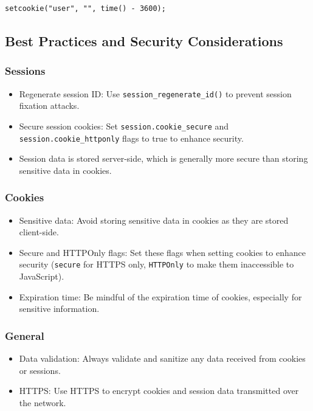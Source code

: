 \documentclass[11pt]{article}
\begin{document}
\begin{verbatim}
setcookie("user", "", time() - 3600);
\end{verbatim}

\subsection{Best Practices and Security Considerations}
\label{sec:org52bc7e4}
\subsubsection{Sessions}
\label{sec:org97fc87b}
\begin{itemize}
\item Regenerate session ID: Use \texttt{session\_regenerate\_id()} to prevent
session fixation attacks.
\item Secure session cookies: Set \texttt{session.cookie\_secure} and
\texttt{session.cookie\_httponly} flags to true to enhance security.
\item Session data is stored server-side, which is generally more secure
than storing sensitive data in cookies.
\end{itemize}

\subsubsection{Cookies}
\label{sec:org08a27a2}
\begin{itemize}
\item Sensitive data: Avoid storing sensitive data in cookies as they are
stored client-side.
\item Secure and HTTPOnly flags: Set these flags when setting cookies to
enhance security (\texttt{secure} for HTTPS only, \texttt{HTTPOnly} to make them
inaccessible to JavaScript).
\item Expiration time: Be mindful of the expiration time of cookies,
especially for sensitive information.
\end{itemize}

\subsubsection{General}
\label{sec:orgae30cf7}
\begin{itemize}
\item Data validation: Always validate and sanitize any data received from
cookies or sessions.
\item HTTPS: Use HTTPS to encrypt cookies and session data transmitted over
the network.
\end{itemize}
\end{document}
